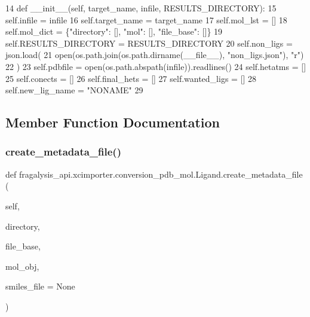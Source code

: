 \begin{DoxyCode}
14     \textcolor{keyword}{def }\_\_init\_\_(self, target\_name, infile, RESULTS\_DIRECTORY):
15         self.infile = infile
16         self.target\_name = target\_name
17         self.mol\_lst = []
18         self.mol\_dict = \{\textcolor{stringliteral}{"directory"}: [], \textcolor{stringliteral}{"mol"}: [], \textcolor{stringliteral}{"file\_base"}: []\}
19         self.RESULTS\_DIRECTORY = RESULTS\_DIRECTORY
20         self.non\_ligs = json.load(
21             open(os.path.join(os.path.dirname(\_\_file\_\_), \textcolor{stringliteral}{"non\_ligs.json"}), \textcolor{stringliteral}{"r")}
22 \textcolor{stringliteral}{        )}
23 \textcolor{stringliteral}{        self.pdbfile = open(os.path.abspath(infile)).readlines()}
24 \textcolor{stringliteral}{        self.hetatms = []}
25 \textcolor{stringliteral}{        self.conects = []}
26 \textcolor{stringliteral}{        self.final\_hets = []}
27 \textcolor{stringliteral}{        self.wanted\_ligs = []}
28 \textcolor{stringliteral}{        self.new\_lig\_name = "NONAME"}
29 
\end{DoxyCode}


\subsection{Member Function Documentation}
\mbox{\label{classfragalysis__api_1_1xcimporter_1_1conversion__pdb__mol_1_1_ligand_a58df3b55a6aca35511598a8d0e25ed6d}} 
\subsubsection{\texorpdfstring{create\+\_\+metadata\+\_\+file()}{create\_metadata\_file()}}
{\footnotesize\ttfamily def fragalysis\+\_\+api.\+xcimporter.\+conversion\+\_\+pdb\+\_\+mol.\+Ligand.\+create\+\_\+metadata\+\_\+file (\begin{DoxyParamCaption}\item[{}]{self,  }\item[{}]{directory,  }\item[{}]{file\+\_\+base,  }\item[{}]{mol\+\_\+obj,  }\item[{}]{smiles\+\_\+file = {\ttfamily None} }\end{DoxyParamCaption})}

